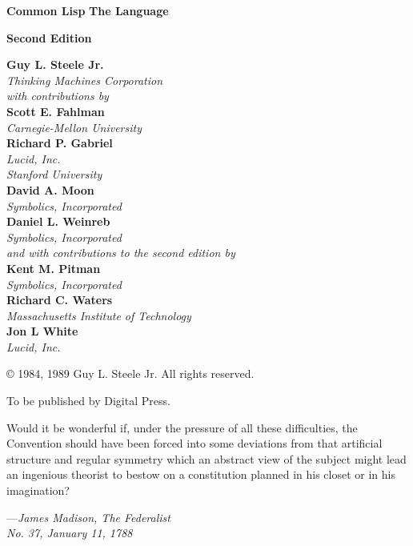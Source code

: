 

\ifx \rulang\Undef

\begin{titlepage}
\noindent\textbf{Common Lisp}
\noindent\textbf{The Language}

\noindent\textbf{Second Edition}

\begin{flushleft}
\textbf{Guy L. Steele Jr.} \\
\emph{Thinking Machines Corporation} \\
\emph{with contributions by} \\
\textbf{Scott E. Fahlman} \\
\emph{Carnegie-Mellon University} \\
\textbf{Richard P. Gabriel} \\
\emph{Lucid, Inc.} \\
\emph{Stanford University} \\
\textbf{David A. Moon} \\
\emph{Symbolics, Incorporated} \\
\textbf{Daniel L. Weinreb} \\
\emph{Symbolics, Incorporated} \\
\emph{and with contributions to the second edition by} \\
\textbf{Kent M. Pitman} \\
\emph{Symbolics, Incorporated} \\
\textbf{Richard C. Waters} \\
\emph{Massachusetts Institute of Technology} \\
\textbf{Jon L White} \\
\emph{Lucid, Inc.}
\end{flushleft}

\begin{center}
\copyright{} 1984, 1989 Guy L. Steele Jr. All rights reserved.
\end{center}

\begin{flushright}
To be published by Digital Press.
\end{flushright}
\end{titlepage}

\newpage

Would it be wonderful if, under the pressure of all these difficulties,
the Convention should have been forced into some deviations from that
artificial structure and regular symmetry which an abstract view of the
subject might lead an ingenious theorist to bestow on a constitution
planned in his closet or in his imagination?
\begin{tabbing}
---\=\emph{James Madison, The Federalist} \\
\>\emph{No. 37, January 11, 1788}
\end{tabbing}


